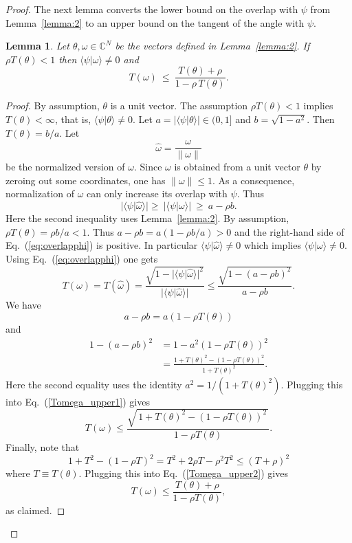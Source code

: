 \documentclass[
  reprint,            %
  amsmath,amssymb,
  aps,
  superscriptaddress, %
  longbibliography
]{revtex4-2}
\newtheorem{lemma}[theorem]{Lemma}
\theoremstyle{definition}
\newcommand{\CC}{\mathbb{C}}
\newcommand{\la}{\langle}
\newcommand{\ra}{\rangle}
\newcommand{\be}{\begin{equation}}
\newcommand{\ee}{\end{equation}}
\begin{document}
\begin{proof}
The next lemma converts the lower bound on the overlap with $\psi$
from Lemma~\ref{lemma:2} to an upper bound on the tangent of the angle with $\psi$.
\begin{lemma}
\label{lemma:2tangent}
Let $\theta,\omega\in \CC^N$ be the vectors
defined in Lemma~\ref{lemma:2}.
If $\rho T(\theta)<1$ then $\la\psi|\omega\ra\neq 0$ and
\[
T(\omega)\ \le\ \frac{T(\theta)+\rho}{1-\rho\,T(\theta)}.
\]
\end{lemma}
\begin{proof}
By assumption, $\theta$ is a unit vector.
The assumption $\rho T(\theta)<1$ implies $T(\theta)<\infty$, that is, $\la \psi|\theta\ra\ne 0$.
Let $a=|\la\psi|\theta\ra|\in(0,1]$ and $b=\sqrt{1-a^2}$. Then $T(\theta)=b/a$.
Let 
\[
\widehat \omega =\frac{\omega}{\|\omega\|}
\]
be the normalized version of $\omega$.
Since $\omega$ is obtained from a unit vector $\theta$ by zeroing out some coordinates,
one has $\|\omega\|\le 1$. As a consequence, normalization of $\omega$
can only increase its overlap with $\psi$. 
Thus
\be\label{eq:overlapphi}
|\la\psi|\widehat \omega\ra| \ge\ |\la\psi|\omega\ra|
\ \ge\ a-\rho b.
\ee
Here the second inequality uses Lemma~\ref{lemma:2}.
By assumption, $\rho T(\theta)=\rho b/a<1$.
Thus $a-\rho b=a(1-\rho b/a)>0$ and  the right-hand side of Eq.~(\ref{eq:overlapphi})
 is positive. In particular
$\la\psi|\widehat \omega\ra\neq 0$ which implies $\la \psi|\omega\ra\ne 0$.
Using Eq.~(\ref{eq:overlapphi}) 
one gets
\be
\label{Tomega_upper1}
T(\omega)=T(\widehat \omega)=\frac{\sqrt{1-|\la\psi|\widehat \omega\ra|^2}}{|\la\psi|\widehat \omega\ra|}
\le \frac{\sqrt{1-(a-\rho b)^2}}{a-\rho b}.
\ee
We have
\[
a-\rho b = a(1-\rho T(\theta))
\]
and
\begin{align*}
1-(a-\rho b)^2
& =1-a^2(1-\rho T(\theta))^2\\
& 
=\frac{1+T(\theta)^2-(1-\rho T(\theta))^2}{1+T(\theta)^2}.
\end{align*}
Here the second equality uses the identity  $a^2=1/(1+T(\theta)^2)$.
Plugging this into Eq.~(\ref{Tomega_upper1}) gives
\be
\label{Tomega_upper2}
T(\omega)\le
\frac{\sqrt{\,1+T(\theta)^2-(1-\rho T(\theta))^2\,}}{1-\rho T(\theta)}.
\ee
Finally, note that
\[
1+T^2-(1-\rho T)^2 = T^2 + 2\rho T - \rho^2T^2 \le (T+\rho)^2
\]
where $T\equiv T(\theta)$.
Plugging this into Eq.~(\ref{Tomega_upper2}) gives
\[
T(\omega)\le \frac{T(\theta)+\rho}{1-\rho T(\theta)},
\]
as claimed.
\end{proof}


\end{proof}
\end{document}
